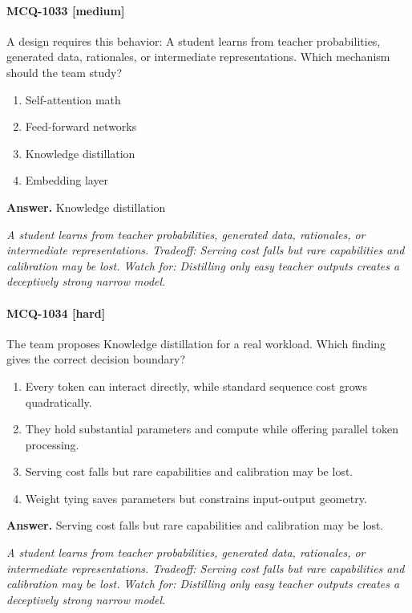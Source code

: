\paragraph{MCQ-1033 [medium]} A design requires this behavior: A student learns from teacher probabilities, generated data, rationales, or intermediate representations. Which mechanism should the team study?
\begin{enumerate}[label=\Alph*.]
\item Self-attention math
\item Feed-forward networks
\item Knowledge distillation
\item Embedding layer
\end{enumerate}
\noindent\textbf{Answer.} Knowledge distillation
\par\textit{A student learns from teacher probabilities, generated data, rationales, or intermediate representations. Tradeoff: Serving cost falls but rare capabilities and calibration may be lost. Watch for: Distilling only easy teacher outputs creates a deceptively strong narrow model.}
\paragraph{MCQ-1034 [hard]} The team proposes Knowledge distillation for a real workload. Which finding gives the correct decision boundary?
\begin{enumerate}[label=\Alph*.]
\item Every token can interact directly, while standard sequence cost grows quadratically.
\item They hold substantial parameters and compute while offering parallel token processing.
\item Serving cost falls but rare capabilities and calibration may be lost.
\item Weight tying saves parameters but constrains input-output geometry.
\end{enumerate}
\noindent\textbf{Answer.} Serving cost falls but rare capabilities and calibration may be lost.
\par\textit{A student learns from teacher probabilities, generated data, rationales, or intermediate representations. Tradeoff: Serving cost falls but rare capabilities and calibration may be lost. Watch for: Distilling only easy teacher outputs creates a deceptively strong narrow model.}
